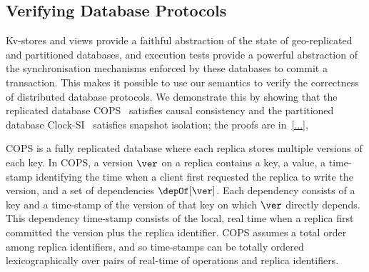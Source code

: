 \subsection{Verifying Database Protocols}
\label{sec:verify-impl}
Kv-stores and views provide a 
faithful abstraction of the state of geo-replicated and partitioned
databases, and  execution tests provide a powerful abstraction of the synchronisation mechanisms 
enforced by these databases to commit a transaction. This makes it
possible to use our 
semantics to verify the correctness of distributed database protocols. 
We  demonstrate this by showing that  the replicated database 
COPS~\cite{cops} satisfies causal consistency  and the partitioned
database Clock-SI~\cite{clocksi} satisfies snapshot isolation; the
proofs are  in~\ref{...}, 

COPS is a fully replicated database where  each replica stores multiple versions of each key. 
In COPS, a version \( \ver \) on a replica contains a key, a value, a
time-stamp identifying the time when a client first requested the
replica to write the version, and a set of dependencies
$\depOf[\ver]$.  Each dependency consists of a key and a time-stamp of
the version of that key on which $\ver$ directly depends.  This
dependency time-stamp consists of the local, real time when a replica
first committed the version plus the replica identifier. COPS assumes
a total order among replica identifiers, and so time-stamps can be
totally ordered lexicographically over pairs of real-time of
operations and replica identifiers.

